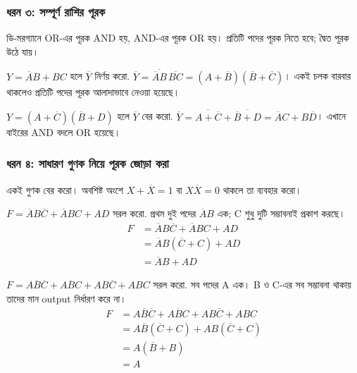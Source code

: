 \subsubsection*{ধরন ৩: সম্পূর্ণ রাশির পূরক}
ডি-মরগ্যানে OR-এর পূরক AND হয়, AND-এর পূরক OR হয়। প্রতিটি পদের পূরক নিতে হবে; দ্বৈত পূরক উঠে যায়।
\par\smallskip\noindent\begin{minipage}{\linewidth}
$Y=\overline AB+BC$ হলে $\overline Y$ নির্ণয় করো.
\chThreeAnswer $\overline Y=\overline{\overline AB}\,\overline{BC}=(A+\overline B)(\overline B+\overline C)$। একই চলক বারবার থাকলেও প্রতিটি পদের পূরক আলাদাভাবে নেওয়া হয়েছে।

\end{minipage}\par\smallskip
\par\smallskip\noindent\begin{minipage}{\linewidth}
$Y=(A+\overline C)(\overline B+D)$ হলে $\overline Y$ বের করো.
\chThreeAnswer $\overline Y=\overline{A+\overline C}+\overline{\overline B+D}=\overline AC+B\overline D$। এখানে বাইরের AND বদলে OR হয়েছে।

\end{minipage}\par\smallskip
{}
\subsubsection*{ধরন ৪: সাধারণ গুণক নিয়ে পূরক জোড়া করা}
একই গুণক বের করো। অবশিষ্ট অংশে $X+\overline X=1$ বা $X\overline X=0$ থাকলে তা ব্যবহার করো।
\par\smallskip\noindent\begin{minipage}{\linewidth}
$F=\overline AB\overline C+\overline ABC+AD$ সরল করো.
\chThreeAnswer প্রথম দুই পদের $\overline AB$ এক; C শুধু দুটি সম্ভাবনাই প্রকাশ করছে।
\[\begin{aligned}F&=\overline AB\overline C+\overline ABC+AD\\
&=\overline AB(\overline C+C)+AD\\
&=\overline AB+AD\end{aligned}\]

\end{minipage}\par\smallskip
\par\smallskip\noindent\begin{minipage}{\linewidth}
$F=A\overline B\overline C+A\overline BC+AB\overline C+ABC$ সরল করো.
\chThreeAnswer সব পদের A এক। B ও C-এর সব সম্ভাবনা থাকায় তাদের মান output নির্ধারণ করে না।
\[\begin{aligned}F&=A\overline B\overline C+A\overline BC+AB\overline C+ABC\\
&=A\overline B(\overline C+C)+AB(\overline C+C)\\
&=A(\overline B+B)\\
&=A\end{aligned}\]

\end{minipage}\par\smallskip
{}
